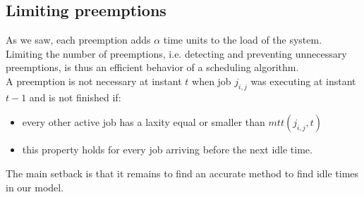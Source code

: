\documentclass[a4paper,10pt]{article}
\begin{document}
    \subsection{Limiting preemptions}

        As we saw, each preemption adds $\alpha$ time units to the load of the system. Limiting the number of preemptions, i.e. detecting and preventing unnecessary preemptions, is thus an efficient behavior of a scheduling algorithm.\\

        A preemption is not necessary at instant $t$ when job $j_{i,j}$ was executing at instant $t-1$ and is not finished if:
        \begin{itemize}
            \item every other active job has a laxity equal or smaller than $mtt(j_{i,j}, t)$
            \item this property holds for every job arriving before the next idle time.
        \end{itemize}

        The main setback is that it remains to find an accurate method to find idle times in our model.



\nocite{*}


\end{document}
